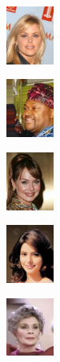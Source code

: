 \documentclass{article}
\begin{document}
\begin{enumerate}
\begin{enumerate}
\begin{figure}[h!]
\begin{minipage}{0.8\textwidth}
						\begin{subfigure}[b]{0.18\textwidth}
							\centering
							\includegraphics[height=1.9cm]{000029}
						\end{subfigure}
						\hfill
						\begin{subfigure}[b]{0.18\textwidth}
							\centering
							\includegraphics[height=1.9cm]{000060}
						\end{subfigure}
						\hfill
						\begin{subfigure}[b]{0.18\textwidth}
							\centering
							\includegraphics[height=1.9cm]{000009}
						\end{subfigure}
						\hfill
						\begin{subfigure}[b]{0.18\textwidth}
							\centering
							\includegraphics[height=1.9cm]{000077}
						\end{subfigure}
						\hfill
						\begin{subfigure}[b]{0.18\textwidth}
							\centering
							\includegraphics[height=1.9cm]{000084}
						\end{subfigure}

						\vspace{0.6cm} %


\end{minipage}
\end{figure}
\end{enumerate}
\end{enumerate}
\end{document}
